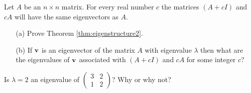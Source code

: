 \begin{thm}\label{thm:eigenstructure2}
    Let $A$ be an $n\times n$ matrix.  For every real number $c$ the matrices $(A + cI)$ and
    $cA$ will have the same eigenvectors as $A$.
\end{thm}
\begin{problem}
    \begin{enumerate}
        \item[(a)] Prove Theorem \ref{thm:eigenstructure2}.
        \item[(b)] If ${\bf v}$ is an eigenvector of the matrix $A$ with eigenvalue $\lambda$
            then what are the eigenvalues of ${\bf v}$ associated with $(A+cI)$ and $cA$ for some
            integer $c$?
    \end{enumerate}
\end{problem}





\begin{problem}
    Is $\lambda = 2$ an eigenvalue of $\begin{pmatrix}3&2\\1&2\end{pmatrix}$?  Why or why
    not?
\end{problem}


